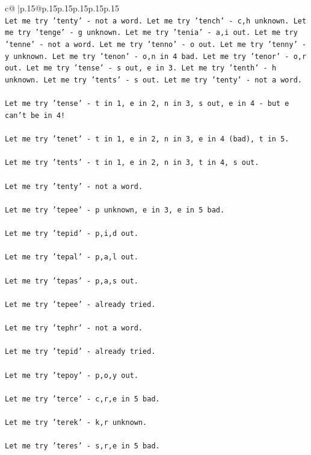 \documentclass{article}
\begin{document}
{\begin{supertabular}{c@{$\;$}|p{.15\linewidth}@{}p{.15\linewidth}p{.15\linewidth}p{.15\linewidth}p{.15\linewidth}p{.15\linewidth}}
{{{\\ 
\texttt{Let me try 'tenty' {-} not a word. Let me try 'tench' {-} c,h unknown. Let me try 'tenge' {-} g unknown. Let me try 'tenia' {-} a,i out. Let me try 'tenne' {-} not a word. Let me try 'tenno' {-} o out. Let me try 'tenny' {-} y unknown. Let me try 'tenon' {-} o,n in 4 bad. Let me try 'tenor' {-} o,r out. Let me try 'tense' {-} s out, e in 3. Let me try 'tenth' {-} h unknown. Let me try 'tents' {-} s out. Let me try 'tenty' {-} not a word. } \\
\\ 
\texttt{Let me try 'tense' {-} t in 1, e in 2, n in 3, s out, e in 4 {-} but e can't be in 4! } \\
\\ 
\texttt{Let me try 'tenet' {-} t in 1, e in 2, n in 3, e in 4 (bad), t in 5. } \\
\\ 
\texttt{Let me try 'tents' {-} t in 1, e in 2, n in 3, t in 4, s out. } \\
\\ 
\texttt{Let me try 'tenty' {-} not a word. } \\
\\ 
\texttt{Let me try 'tepee' {-} p unknown, e in 3, e in 5 bad. } \\
\\ 
\texttt{Let me try 'tepid' {-} p,i,d out. } \\
\\ 
\texttt{Let me try 'tepal' {-} p,a,l out. } \\
\\ 
\texttt{Let me try 'tepas' {-} p,a,s out. } \\
\\ 
\texttt{Let me try 'tepee' {-} already tried. } \\
\\ 
\texttt{Let me try 'tephr' {-} not a word. } \\
\\ 
\texttt{Let me try 'tepid' {-} already tried. } \\
\\ 
\texttt{Let me try 'tepoy' {-} p,o,y out. } \\
\\ 
\texttt{Let me try 'terce' {-} c,r,e in 5 bad. } \\
\\ 
\texttt{Let me try 'terek' {-} k,r unknown. } \\
\\ 
\texttt{Let me try 'teres' {-} s,r,e in 5 bad. } \\
}}}
\end{supertabular}}
\end{document}

